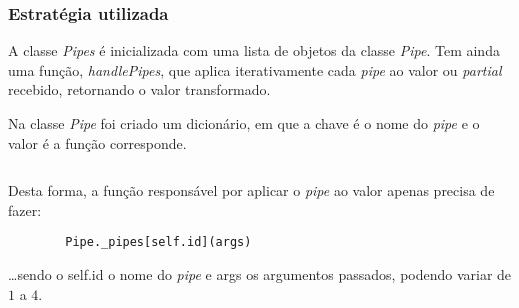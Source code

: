 \documentclass[../relatorio.tex]{subfiles}
\begin{document}
    \subsubsection{Estratégia utilizada}

    A classe \textit{Pipes} é inicializada com uma lista de objetos da classe 
    \textit{Pipe}. Tem ainda uma função, \textit{handlePipes}, que aplica iterativamente
    cada \textit{pipe} ao valor ou \textit{partial} recebido, retornando o valor transformado.

    Na classe \textit{Pipe} foi criado um dicionário, em que a chave é o nome do \textit{pipe} 
    e o valor é a função corresponde. 
    
    \inputminted[firstline=168, lastline=185]{py}{../modules/Pipe.py}
    
    Desta forma, a função responsável por aplicar o \textit{pipe} ao valor apenas precisa
    de fazer:
    \begin{verbatim}
        Pipe._pipes[self.id](args)
    \end{verbatim}
    \dots sendo o self.id o nome do \textit{pipe} e args os argumentos passados, podendo variar de
    $1$ a $4$.
\end{document}
